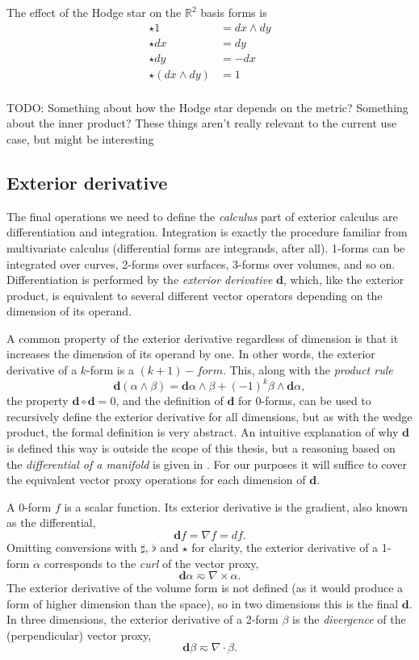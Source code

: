 \documentclass[utf8,english]{gradu3}
\begin{document}
The effect of the Hodge star on the $\mathbb{R}^2$ basis forms is
\begin{align*}
  \star 1 &= dx \wedge dy \\
  \star dx &= dy \\
  \star dy &= -dx \\
  \star (dx \wedge dy) &= 1 \\
\end{align*}

TODO: Something about how
the Hodge star depends on the metric?
Something about the inner product?
These things aren't really relevant to the current use case,
but might be interesting

\subsection{Exterior derivative}\label{sec:ext_der}

The final operations we need to define the \textit{calculus} part of exterior calculus
are differentiation and integration.
Integration is exactly the procedure familiar from multivariate calculus
(differential forms are integrands, after all).
1-forms can be integrated over curves, 2-forms over surfaces,
3-forms over volumes, and so on.
Differentiation is performed by the \textit{exterior derivative} $\mathbf{d}$,
which, like the exterior product,
is equivalent to several different vector operators
depending on the dimension of its operand.

A common property of the exterior derivative regardless of dimension
is that it increases the dimension of its operand by one.
In other words, the exterior derivative of a $k$-form is a $(k+1)-form$.
This, along with the \textit{product rule}
\[
  \mathbf{d}(\alpha \wedge \beta)
  = \mathbf{d}\alpha \wedge \beta + (-1)^k \beta \wedge \mathbf{d}\alpha,
\]
the property $\mathbf{d} \circ \mathbf{d} = 0$,
and the definition of $\mathbf{d}$ for 0-forms,
can be used to recursively define the exterior derivative for all dimensions,
but as with the wedge product, the formal definition is very abstract.
An intuitive explanation of why $\mathbf{d}$ is defined this way
is outside the scope of this thesis,
but a reasoning based on the \textit{differential of a manifold}
is given in \cite{crane_digital_2013}.
For our purposes it will suffice to cover the equivalent vector proxy operations
for each dimension of $\mathbf{d}$.

A 0-form $f$ is a scalar function.
Its exterior derivative is the gradient, also known as the differential,
\[
  \mathbf{d}f = \nabla f = df.
\]
Omitting conversions with $\sharp$, $\flat$ and $\star$ for clarity,
the exterior derivative of a 1-form $\alpha$ corresponds to the
\textit{curl} of the vector proxy,
\[
  \mathbf{d}\alpha \eqsim \nabla \times \alpha.
\]
The exterior derivative of the volume form is not defined
(as it would produce a form of higher dimension than the space),
so in two dimensions this is the final $\mathbf{d}$.
In three dimensions, the exterior derivative of a 2-form $\beta$
is the \textit{divergence} of the (perpendicular) vector proxy,
\[
  \mathbf{d}\beta \eqsim \nabla \cdot \beta.
\]
\end{document}
